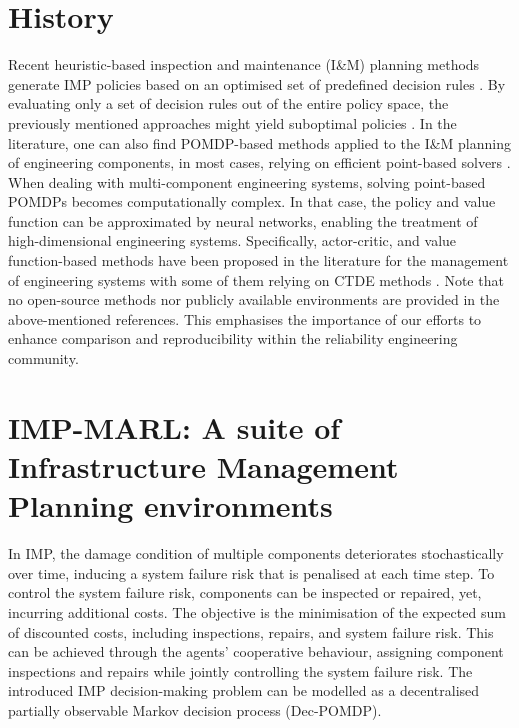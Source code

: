 \section{History} \label{sec:ch5_relatedwork}
Recent heuristic-based inspection and maintenance (I\&M) planning methods generate IMP policies based on an optimised set of predefined decision rules \citep{LuqueDBN2019, Bismut2019OptimalDete}.
By evaluating only a set of decision rules out of the entire policy space, the previously mentioned approaches might yield suboptimal policies \citep{morato2022optimal}.
In the literature, one can also find POMDP-based methods applied to the I\&M planning of engineering components, in most cases, relying on efficient point-based solvers \citep{Papakonstantinou2014Part1, Papakonstantinou2014Part2, morato2022optimal}. 
When dealing with multi-component engineering systems, solving point-based POMDPs becomes computationally complex.
In that case, the policy and value function can be approximated by neural networks, enabling the treatment of high-dimensional engineering systems.
Specifically, actor-critic, and value function-based methods have been proposed in the literature for the management of engineering systems \citep{Andriotis2019ManagingLearning,andriotis2021deep,morato2022syst} with some of them relying on CTDE methods \citep{nguyen2022weighted, saifullah2022deep}. Note that no open-source methods nor publicly available environments are provided in the above-mentioned references.
This emphasises the importance of our efforts to enhance comparison and reproducibility within the reliability engineering community.


\section{IMP-MARL: A suite of Infrastructure Management Planning environments} \label{sec:ch5_imp}

In IMP, the damage condition of multiple components deteriorates stochastically over time, inducing a system failure risk that is penalised at each time step.
To control the system failure risk, components can be inspected or repaired, yet, incurring additional costs.
The objective is the minimisation of the expected sum of discounted costs, including inspections, repairs, and system failure risk.
This can be achieved through the agents' cooperative behaviour, assigning component inspections and repairs while jointly controlling the system failure risk.
The introduced IMP decision-making problem can be modelled as a decentralised partially observable Markov decision process (Dec-POMDP).

